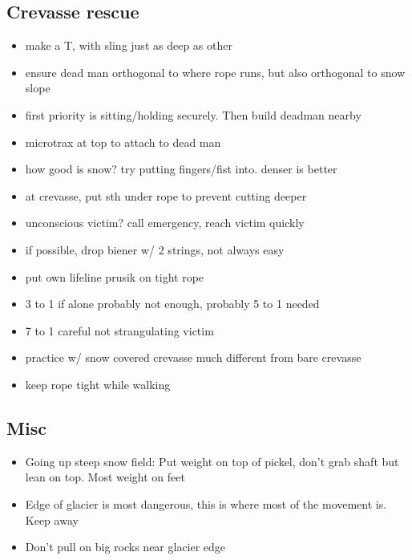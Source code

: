 \subsection{Crevasse rescue}
\begin{itemize}
\item make a T, with sling just as deep as other
\item ensure dead man orthogonal to where rope runs, but also orthogonal to snow slope
\item first priority is sitting/holding securely. Then build deadman nearby
\item microtrax at top to attach to dead man
\item how good is snow? try putting fingers/fist into. denser is better
\item at crevasse, put sth under rope to prevent cutting deeper
\item unconscious victim? call emergency, reach victim quickly
\item if possible, drop biener w/ 2 strings, not always easy
\item put own lifeline prusik on tight rope
\item 3 to 1 if alone probably not enough, probably 5 to 1 needed
\item 7 to 1 careful not strangulating victim
\item practice w/ snow covered crevasse much different from bare crevasse
\item keep rope tight while walking
\end{itemize}

\subsection{Misc}
\begin{itemize}
\item Going up steep snow field: Put weight on top of pickel, don't grab shaft but lean on top. Most weight on feet
\item Edge of glacier is most dangerous, this is where most of the movement is. Keep away
\item Don't pull on big rocks near glacier edge
\end{itemize}
